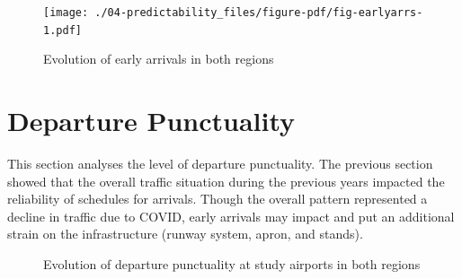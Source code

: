 \documentclass[
  a4paper,
  DIV=11,
  numbers=noendperiod]{scrreprt}
\begin{document}
\begin{figure}[h]

{\centering \texttt{[image: ./04-predictability\_files/figure-pdf/fig-earlyarrs-1.pdf]}

}

\caption{\label{fig-earlyarrs}Evolution of early arrivals in both
regions}

\end{figure}

\hypertarget{departure-punctuality}{%
\section{Departure Punctuality}\label{departure-punctuality}}

This section analyses the level of departure punctuality. The previous
section showed that the overall traffic situation during the previous
years impacted the reliability of schedules for arrivals. Though the
overall pattern represented a decline in traffic due to COVID, early
arrivals may impact and put an additional strain on the infrastructure
(runway system, apron, and stands).

\begin{figure}

\begin{minipage}[t]{\linewidth}

{\centering 


}

\end{minipage}%
\newline
\begin{minipage}[t]{\linewidth}

{\centering 


}

\end{minipage}%
\newline
\begin{minipage}[t]{\linewidth}

{\centering 


}

\end{minipage}%

\caption{\label{fig-deppunc}Evolution of departure punctuality at study
airports in both regions}

\end{figure}
\end{document}
